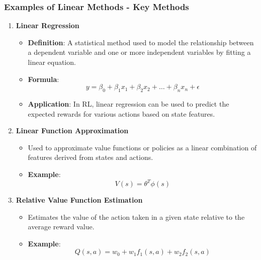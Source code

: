 \documentclass[aspectratio=169]{beamer}
\begin{document}
\begin{frame}[fragile]
    \frametitle{Examples of Linear Methods - Key Methods}
    \begin{enumerate}
        \item \textbf{Linear Regression}
            \begin{itemize}
                \item \textbf{Definition}: A statistical method used to model the relationship between a dependent variable and one or more independent variables by fitting a linear equation.
                \item \textbf{Formula}:
                \begin{equation}
                y = \beta_0 + \beta_1 x_1 + \beta_2 x_2 + \ldots + \beta_n x_n + \epsilon
                \end{equation}
                \item \textbf{Application}: In RL, linear regression can be used to predict the expected rewards for various actions based on state features.
            \end{itemize}

        \item \textbf{Linear Function Approximation}
            \begin{itemize}
                \item Used to approximate value functions or policies as a linear combination of features derived from states and actions.
                \item \textbf{Example}:
                \begin{equation}
                V(s) = \theta^T \phi(s)
                \end{equation}
            \end{itemize}
        \item \textbf{Relative Value Function Estimation}
            \begin{itemize}
                \item Estimates the value of the action taken in a given state relative to the average reward value.
                \item \textbf{Example}:
                \begin{equation}
                Q(s, a) = w_0 + w_1 f_1(s, a) + w_2 f_2(s, a)
                \end{equation}
            \end{itemize}
    \end{enumerate}
\end{frame}
\end{document}
